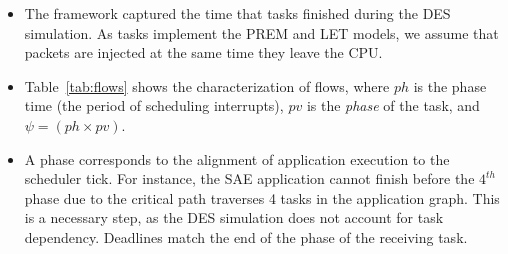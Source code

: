 \begin{frame}
	
	\begin{itemize}
		
		\item The framework captured the time that tasks finished during the DES simulation. As tasks implement the PREM and LET models, we assume that packets are injected at the same time they leave the CPU.
		
		\item Table~\ref{tab:flows} shows the characterization of flows, where $ph$ is the phase time (the period of scheduling interrupts), $pv$ is the \textit{phase} of the task, and $\psi = (ph \times pv)$. 
		
		\item A phase corresponds to the alignment of application execution to the scheduler tick. For instance, the SAE application cannot finish before the $4^{th}$ phase due to the critical path traverses 4 tasks in the application graph. This is a necessary step, as the DES simulation does not account for task dependency. Deadlines match the end of the phase of the receiving task.%
				
	\end{itemize}
	
\end{frame}



